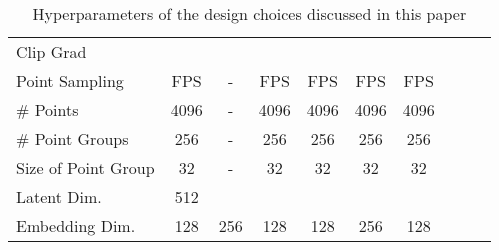\begin{table}[h!]
\begin{adjustbox}{max width=0.8\textwidth}
\begin{tabular}{l c c c c c c c c c}
        Clip Grad         &          &                   &                      &                      &                      &                                   \\
        Point Sampling    &    FPS      &      -    &    FPS         &          FPS            &          FPS            &          FPS                         \\
        \# Points  &    4096     &     -     &    4096           &       4096               &      4096                &          4096                         \\
        \# Point Groups &    256     &     -     &    256           &       256               &      256                &          256                         \\
        Size of Point Group  &    32     &     -     &    32           &       32               &      32                &          32                         \\
        Latent Dim.      &     512     &                   &                      &                      &                      &                                   \\
        Embedding Dim.      &     128     &    256      &    128      &                                 128           &         256             &      128                             \\
        \bottomrule
    \end{tabular}
    \end{adjustbox}
    \caption{Hyperparameters of the design choices discussed in this paper}
    \label{tab:hyperparameters}
\end{table}